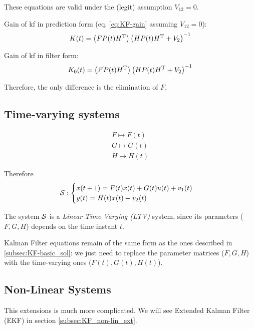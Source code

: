 \begin{remark}
    These equations are valid under the (legit) assumption $V_{12} = 0$.
\end{remark}

\begin{obs}
    Gain of \gls{kf} in prediction form (eq. \ref{eq:KF-gain} assuming $V_{12}=0$):
    \[
        K(t) = \left( FP(t)H^{\mathrm{T}} \right) \left( HP(t)H^{\mathrm{T}}+V_2 \right)^{-1}
    \]

    Gain of \gls{kf} in filter form:
    \[
        K_0(t) = \left(\textcolor{gray}{\cancel{F}} P(t)H\transpose \right) \left( HP(t)H\transpose+V_2 \right)^{-1}
    \]

    Therefore, the only difference is the elimination of $F$.
\end{obs}


\subsection{Time-varying systems}\label{subsec:time-varying_extension}

\begin{align*}
    F \mapsto F(t) \\
    G \mapsto G(t) \\
    H \mapsto H(t)
\end{align*}

Therefore
\[
    \mathcal{S}: \begin{cases}
        x(t+1) = F(t)x(t) + G(t)u(t) + v_1(t) \\
        y(t) = H(t)x(t) + v_2(t)
    \end{cases}
\]

\begin{definition} 
    The system $\mathcal{S}$ is a \emph{Linear Time Varying (LTV)} system, since its parameters ($F,G,H$) depends on the time instant $t$.
\end{definition}

Kalman Filter equations remain of the same form as the ones described in \ref{subsec:KF-basic_sol}: we just need to replace the parameter matrices ($F,G,H$) with the time-varying ones ($F(t),G(t),H(t)$).

\subsection{Non-Linear Systems}

This extensions is much more complicated. We will see Extended Kalman Filter (EKF) in section \ref{subsec:KF_non-lin_ext}.

